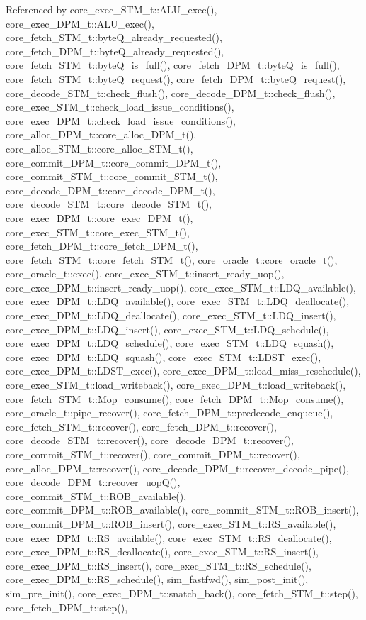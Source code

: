 Referenced by core\_\-exec\_\-STM\_\-t::ALU\_\-exec(), core\_\-exec\_\-DPM\_\-t::ALU\_\-exec(), core\_\-fetch\_\-STM\_\-t::byteQ\_\-already\_\-requested(), core\_\-fetch\_\-DPM\_\-t::byteQ\_\-already\_\-requested(), core\_\-fetch\_\-STM\_\-t::byteQ\_\-is\_\-full(), core\_\-fetch\_\-DPM\_\-t::byteQ\_\-is\_\-full(), core\_\-fetch\_\-STM\_\-t::byteQ\_\-request(), core\_\-fetch\_\-DPM\_\-t::byteQ\_\-request(), core\_\-decode\_\-STM\_\-t::check\_\-flush(), core\_\-decode\_\-DPM\_\-t::check\_\-flush(), core\_\-exec\_\-STM\_\-t::check\_\-load\_\-issue\_\-conditions(), core\_\-exec\_\-DPM\_\-t::check\_\-load\_\-issue\_\-conditions(), core\_\-alloc\_\-DPM\_\-t::core\_\-alloc\_\-DPM\_\-t(), core\_\-alloc\_\-STM\_\-t::core\_\-alloc\_\-STM\_\-t(), core\_\-commit\_\-DPM\_\-t::core\_\-commit\_\-DPM\_\-t(), core\_\-commit\_\-STM\_\-t::core\_\-commit\_\-STM\_\-t(), core\_\-decode\_\-DPM\_\-t::core\_\-decode\_\-DPM\_\-t(), core\_\-decode\_\-STM\_\-t::core\_\-decode\_\-STM\_\-t(), core\_\-exec\_\-DPM\_\-t::core\_\-exec\_\-DPM\_\-t(), core\_\-exec\_\-STM\_\-t::core\_\-exec\_\-STM\_\-t(), core\_\-fetch\_\-DPM\_\-t::core\_\-fetch\_\-DPM\_\-t(), core\_\-fetch\_\-STM\_\-t::core\_\-fetch\_\-STM\_\-t(), core\_\-oracle\_\-t::core\_\-oracle\_\-t(), core\_\-oracle\_\-t::exec(), core\_\-exec\_\-STM\_\-t::insert\_\-ready\_\-uop(), core\_\-exec\_\-DPM\_\-t::insert\_\-ready\_\-uop(), core\_\-exec\_\-STM\_\-t::LDQ\_\-available(), core\_\-exec\_\-DPM\_\-t::LDQ\_\-available(), core\_\-exec\_\-STM\_\-t::LDQ\_\-deallocate(), core\_\-exec\_\-DPM\_\-t::LDQ\_\-deallocate(), core\_\-exec\_\-STM\_\-t::LDQ\_\-insert(), core\_\-exec\_\-DPM\_\-t::LDQ\_\-insert(), core\_\-exec\_\-STM\_\-t::LDQ\_\-schedule(), core\_\-exec\_\-DPM\_\-t::LDQ\_\-schedule(), core\_\-exec\_\-STM\_\-t::LDQ\_\-squash(), core\_\-exec\_\-DPM\_\-t::LDQ\_\-squash(), core\_\-exec\_\-STM\_\-t::LDST\_\-exec(), core\_\-exec\_\-DPM\_\-t::LDST\_\-exec(), core\_\-exec\_\-DPM\_\-t::load\_\-miss\_\-reschedule(), core\_\-exec\_\-STM\_\-t::load\_\-writeback(), core\_\-exec\_\-DPM\_\-t::load\_\-writeback(), core\_\-fetch\_\-STM\_\-t::Mop\_\-consume(), core\_\-fetch\_\-DPM\_\-t::Mop\_\-consume(), core\_\-oracle\_\-t::pipe\_\-recover(), core\_\-fetch\_\-DPM\_\-t::predecode\_\-enqueue(), core\_\-fetch\_\-STM\_\-t::recover(), core\_\-fetch\_\-DPM\_\-t::recover(), core\_\-decode\_\-STM\_\-t::recover(), core\_\-decode\_\-DPM\_\-t::recover(), core\_\-commit\_\-STM\_\-t::recover(), core\_\-commit\_\-DPM\_\-t::recover(), core\_\-alloc\_\-DPM\_\-t::recover(), core\_\-decode\_\-DPM\_\-t::recover\_\-decode\_\-pipe(), core\_\-decode\_\-DPM\_\-t::recover\_\-uopQ(), core\_\-commit\_\-STM\_\-t::ROB\_\-available(), core\_\-commit\_\-DPM\_\-t::ROB\_\-available(), core\_\-commit\_\-STM\_\-t::ROB\_\-insert(), core\_\-commit\_\-DPM\_\-t::ROB\_\-insert(), core\_\-exec\_\-STM\_\-t::RS\_\-available(), core\_\-exec\_\-DPM\_\-t::RS\_\-available(), core\_\-exec\_\-STM\_\-t::RS\_\-deallocate(), core\_\-exec\_\-DPM\_\-t::RS\_\-deallocate(), core\_\-exec\_\-STM\_\-t::RS\_\-insert(), core\_\-exec\_\-DPM\_\-t::RS\_\-insert(), core\_\-exec\_\-STM\_\-t::RS\_\-schedule(), core\_\-exec\_\-DPM\_\-t::RS\_\-schedule(), sim\_\-fastfwd(), sim\_\-post\_\-init(), sim\_\-pre\_\-init(), core\_\-exec\_\-DPM\_\-t::snatch\_\-back(), core\_\-fetch\_\-STM\_\-t::step(), core\_\-fetch\_\-DPM\_\-t::step(), 